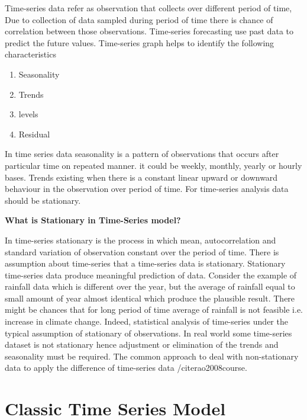 Time-series data refer as observation that collects over different period of time, Due to collection of data sampled during period of time there is chance of correlation between those observations. Time-series forecasting use past data to predict the future values. Time-series graph helps to identify the following characteristics

\begin{enumerate}
\item Seasonality
\item Trends
\item levels
\item Residual
\end{enumerate}
In time series data seasonality is a pattern of observations that occurs after particular time on repeated manner. it could be weekly, monthly, yearly or hourly bases. Trends existing when there is a constant linear upward or downward behaviour in the observation over period of time. For time-series analysis data should be stationary.

\textbf{What is Stationary in Time-Series model?}

In time-series stationary is the process in which mean, autocorrelation and standard variation of observation constant over the period of time. There is assumption about time-series that a time-series data is stationary. Stationary time-series data produce meaningful prediction of data. Consider the example of rainfall data which is different over the year, but the average of rainfall equal to small amount of year almost identical which produce the plausible result. There might be chances that for long period of time average of rainfall is not feasible i.e. increase in climate change. Indeed, statistical analysis of time-series  under the typical assumption of stationary of  observations. In real world some time-series dataset is not stationary hence adjustment or elimination of the trends and seasonality  must be required. The common approach to deal with non-stationary data to apply the difference of time-series data /cite{rao2008course}.   
 
\section{Classic Time Series Model}
